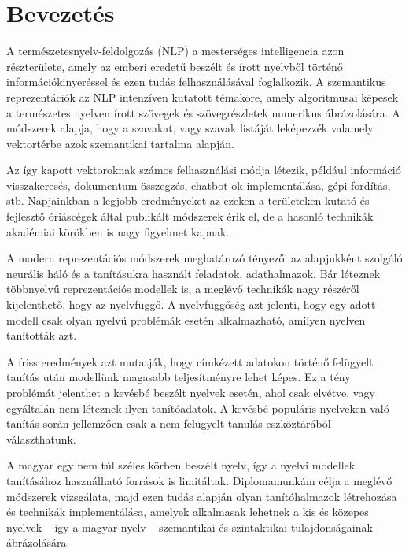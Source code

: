 \chapter{Bevezetés} %
\label{ch:intro}

A természetesnyelv-feldolgozás (NLP) a mesterséges intelligencia azon részterülete, amely az emberi eredetű beszélt és írott nyelvből történő információkinyeréssel és ezen tudás felhasználásával foglalkozik. A szemantikus reprezentációk az NLP intenzíven kutatott témaköre, amely algoritmusai képesek a természetes nyelven írott szövegek és szövegrészletek numerikus ábrázolására. A módszerek alapja, hogy a szavakat, vagy szavak listáját leképezzék valamely vektortérbe azok szemantikai tartalma alapján. 

Az így kapott vektoroknak számos felhasználási módja létezik, például információ visszakeresés, dokumentum összegzés, chatbot-ok implementálása, gépi fordítás, stb. Napjainkban a legjobb eredményeket az ezeken a területeken kutató és fejlesztő óriáscégek által publikált módszerek érik el, de a hasonló technikák akadémiai körökben is nagy figyelmet kapnak.

A modern reprezentációs módszerek meghatározó tényezői az alapjukként szolgáló neurális háló és a tanításukra használt feladatok, adathalmazok.
Bár léteznek többnyelvű reprezentációs modellek is, a meglévő technikák nagy részéről kijelenthető, hogy az nyelvfüggő. A nyelvfüggőség azt jelenti, hogy egy adott modell csak olyan nyelvű problémák esetén alkalmazható, amilyen nyelven tanították azt.

A friss eredmények azt mutatják, hogy címkézett adatokon történő felügyelt tanítás után modellünk magasabb teljesítményre lehet képes. Ez a tény problémát jelenthet a kevésbé beszélt nyelvek esetén, ahol csak elvétve, vagy egyáltalán nem léteznek ilyen tanítóadatok. A kevésbé populáris nyelveken való tanítás során jellemzően csak a nem felügyelt tanulás eszköztárából választhatunk.

A magyar egy nem túl széles körben beszélt nyelv, így a nyelvi modellek tanításához használható források is limitáltak. Diplomamunkám célja a meglévő módszerek vizsgálata, majd ezen tudás alapján olyan tanítóhalmazok létrehozása és technikák implementálása, amelyek alkalmasak lehetnek a kis és közepes nyelvek – így a magyar nyelv – szemantikai és szintaktikai tulajdonságainak ábrázolására. 
